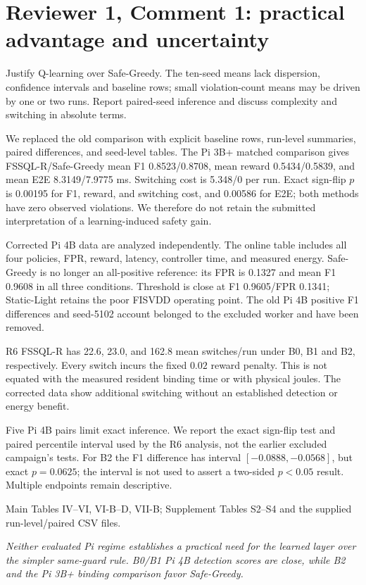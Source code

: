 \documentclass[10pt,a4paper]{article}
\newcommand{\commentbox}[1]{\begin{rcommentbox}#1\end{rcommentbox}}
\newcommand{\responsebox}[1]{\begin{authorresponsebox}#1\end{authorresponsebox}}
\newcommand{\changebox}[1]{\begin{wherebox}#1\end{wherebox}}
\begin{document}
\clearpage
\section*{Reviewer 1, Comment 1: practical advantage and uncertainty}
\commentbox{Justify Q-learning over Safe-Greedy. The ten-seed means lack dispersion, confidence intervals and baseline rows; small violation-count means may be driven by one or two runs. Report paired-seed inference and discuss complexity and switching in absolute terms.}
\responsebox{We replaced the old comparison with explicit baseline rows, run-level summaries, paired differences, and seed-level tables. The Pi 3B+ matched comparison gives FSSQL-R/Safe-Greedy mean F1 0.8523/0.8708, mean reward 0.5434/0.5839, and mean E2E 8.3149/7.9775 ms. Switching cost is 5.348/0 per run. Exact sign-flip $p$ is 0.00195 for F1, reward, and switching cost, and 0.00586 for E2E; both methods have zero observed violations. We therefore do not retain the submitted interpretation of a learning-induced safety gain.

Corrected Pi 4B data are analyzed independently. The online table includes all four policies, FPR, reward, latency, controller time, and measured energy. Safe-Greedy is no longer an all-positive reference: its FPR is 0.1327 and mean F1 0.9608 in all three conditions. Threshold is close at F1 0.9605/FPR 0.1341; Static-Light retains the poor FISVDD operating point. The old Pi 4B positive F1 differences and seed-5102 account belonged to the excluded worker and have been removed.

R6 FSSQL-R has 22.6, 23.0, and 162.8 mean switches/run under B0, B1 and B2, respectively. Every switch incurs the fixed $0.02$ reward penalty. This is not equated with the measured resident binding time or with physical joules. The corrected data show additional switching without an established detection or energy benefit.

Five Pi 4B pairs limit exact inference. We report the exact sign-flip test and paired percentile interval used by the R6 analysis, not the earlier excluded campaign's tests. For B2 the F1 difference has interval $[-0.0888,-0.0568]$, but exact $p=0.0625$; the interval is not used to assert a two-sided $p<0.05$ result. Multiple endpoints remain descriptive.}
\changebox{Main Tables IV--VI, VI-B--D, VII-B; Supplement Tables S2--S4 and the supplied run-level/paired CSV files.}
\begin{excerptbox}\emph{Neither evaluated Pi regime establishes a practical need for the learned layer over the simpler same-guard rule. B0/B1 Pi 4B detection scores are close, while B2 and the Pi 3B+ binding comparison favor Safe-Greedy.}\end{excerptbox}
\end{document}

